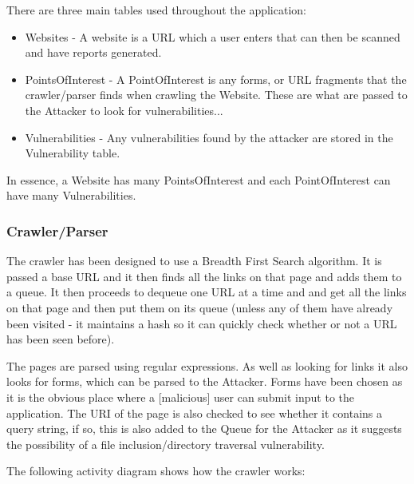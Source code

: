\documentclass[12pt,a4paper]{article}
\begin{document}
There are three main tables used throughout the application:

\begin{itemize}
    \item{Websites - A website is a URL which a user enters that can then be scanned and have reports generated.}
    \item{PointsOfInterest - A PointOfInterest is any forms, or URL fragments that the crawler/parser finds when crawling the Website.  These are what are passed to the Attacker to look for vulnerabilities...}
    \item{Vulnerabilities - Any vulnerabilities found by the attacker are stored in the Vulnerability table.}
\end{itemize}

In essence, a Website has many PointsOfInterest and each PointOfInterest can have many Vulnerabilities.

\subsubsection{Crawler/Parser}
The crawler has been designed to use a Breadth First Search algorithm.  It is passed a base URL and it then finds all the links on that page and adds them to a queue.  It then proceeds to dequeue one URL at a time and and get all the links on that page and then put them on its queue (unless any of them have already been visited - it maintains a hash so it can quickly check whether or not a URL has been seen before).

The pages are parsed using regular expressions.  As well as looking for links it also looks for forms, which can be parsed to the Attacker.  Forms have been chosen as it is the obvious place where a [malicious] user can submit input to the application.  The URI of the page is also checked to see whether it contains a query string, if so, this is also added to the Queue for the Attacker as it suggests the possibility of a file inclusion/directory traversal vulnerability.

The following activity diagram shows how the crawler works:
\end{document}
